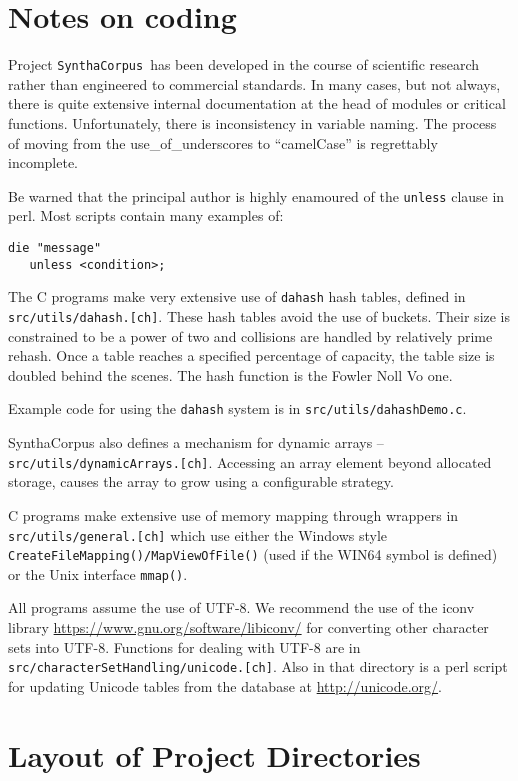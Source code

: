 \documentclass{article}
\newcommand{\projectName}{\texttt{SynthaCorpus}}
\begin{document}
\section{Notes on coding}

Project \projectName~has been developed in the course of scientific
research rather than engineered to commercial standards.  In many
cases, but not always, there is quite extensive internal documentation
at the head of modules or critical functions.
Unfortunately, there is inconsistency in variable
naming. The process of moving from the use\_of\_underscores to
``camelCase'' is regrettably incomplete.

Be warned that the principal author is highly enamoured of the
\texttt{unless} clause in perl.  Most scripts contain many examples
of:
\begin{verbatim}
die "message"
   unless <condition>;
\end{verbatim}

The C programs make very extensive use of \texttt{dahash} hash tables,
defined in \texttt{src/utils/dahash.[ch]}.  These hash tables avoid
the use of buckets.  Their size is constrained to be a power of two
and collisions are handled by relatively prime rehash.  Once a table
reaches a specified percentage of capacity, the table size is doubled
behind the scenes.  The hash function is the Fowler Noll Vo one.

Example code for using the \texttt{dahash} system is in
\texttt{src/utils/dahashDemo.c}.


SynthaCorpus also defines a mechanism for dynamic arrays --
\texttt{src/utils/dynamicArrays.[ch]}.  Accessing an array element
beyond allocated storage, causes the array to grow using a
configurable strategy.

C programs make extensive use of memory mapping through wrappers in
\texttt{src/utils/general.[ch]} which use either the
Windows style \texttt{CreateFileMapping()/MapViewOfFile()} (used if the
WIN64 symbol is defined) or the Unix interface \texttt{mmap()}.

All programs assume the use of UTF-8.  We recommend the use of the
iconv library \url{https://www.gnu.org/software/libiconv/} for
converting other character sets into UTF-8.  Functions for dealing
with UTF-8 are in \texttt{src/characterSetHandling/unicode.[ch]}.
Also in that directory is a perl script for updating Unicode tables
from the database at \url{http://unicode.org/}.


\section{Layout of Project Directories}
\end{document}
